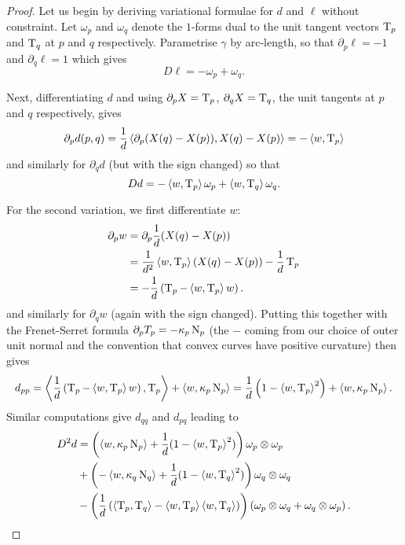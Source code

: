 \documentclass[a4paper, 12pt]{amsart}
\begin{document}
\begin{proof}
Let us begin by deriving variational formulae for $d$ and $\ell$ without constraint. Let $\omega_p$ and $\omega_q$ denote the $1$-forms dual to the unit tangent vectors $\operatorname{T}_p$ and $\operatorname{T}_q$ at $p$ and $q$ respectively. Parametrise $\gamma$ by arc-length, so that $\partial_p \ell = - 1$ and $\partial_q \ell = 1$ which gives 
\begin{equation}
\label{eq:l_first_var}
D\ell = -\omega_p + \omega_q.
\end{equation}

Next, differentiating $d$ and using $\partial_pX = \operatorname{T}_p$, $\partial_qX = \operatorname{T}_q$, the unit tangents at $p$ and $q$ respectively, gives
\[
\partial_p d (p, q) = \frac{1}{d} \left\langle \partial_p(X(q) - X(p)),X(q) - X(p) \right\rangle = -\left\langle w,\operatorname{T}_p \right\rangle
\]
and similarly for $\partial_q d$ (but with the sign changed) so that
\begin{equation}
\label{eq:d_first_var}
Dd = -\left\langle w,\operatorname{T}_p \right\rangle \omega_p + \left\langle w,\operatorname{T}_q \right\rangle \omega_q.
\end{equation}

For the second variation, we first differentiate $w$:
\[
\begin{split}
\partial_p w &= \partial_p \frac{1}{d} (X(q) - X(p)) \\
&= \frac{1}{d^2} \left\langle w,\operatorname{T}_p \right\rangle (X(q) - X(p)) - \frac{1}{d} \operatorname{T}_p \\
&= -\frac{1}{d}\left(\operatorname{T}_p - \left\langle w,\operatorname{T}_p \right\rangle w\right).
\end{split}
\]
and similarly for $\partial_q w$ (again with the sign changed).  Putting this together with the Frenet-Serret formula $\partial_p T_p = -\kappa_p \operatorname{N}_p$ (the $-$ coming from our choice of outer unit normal and the convention that convex curves have positive curvature) then gives
\[
d_{pp} = \left\langle \frac{1}{d}\left(\operatorname{T}_p - \left\langle w,\operatorname{T}_p \right\rangle w\right),\operatorname{T}_p \right\rangle + \left\langle w,\kappa_p \operatorname{N}_p \right\rangle = \frac{1}{d}\left(1 - \left\langle w,\operatorname{T}_p \right\rangle^2\right) + \left\langle w,\kappa_p \operatorname{N}_p \right\rangle.
\]
Similar computations give $d_{qq}$ and $d_{pq}$ leading to
\begin{equation}
\label{eq:d_second_var}
\begin{split}
D^2d &= \left(\left\langle w,\kappa_p \operatorname{N}_p \right\rangle + \frac{1}{d}(1 - \left\langle w,\operatorname{T}_p \right\rangle^2) \right) \omega_p \otimes \omega_p \\
&+ \left(-\left\langle w,\kappa_q \operatorname{N}_q \right\rangle + \frac{1}{d}(1 - \left\langle w,\operatorname{T}_q \right\rangle^2) \right) \omega_q \otimes \omega_q \\
&- \left(\frac{1}{d}\left(\left\langle \operatorname{T}_p,\operatorname{T}_q \right\rangle - \left\langle w,\operatorname{T}_p \right\rangle\left\langle w,\operatorname{T}_q \right\rangle\right) \right) \left(\omega_p \otimes \omega_q + \omega_q \otimes \omega_p\right).
\end{split}
\end{equation}


\end{proof}
\end{document}
